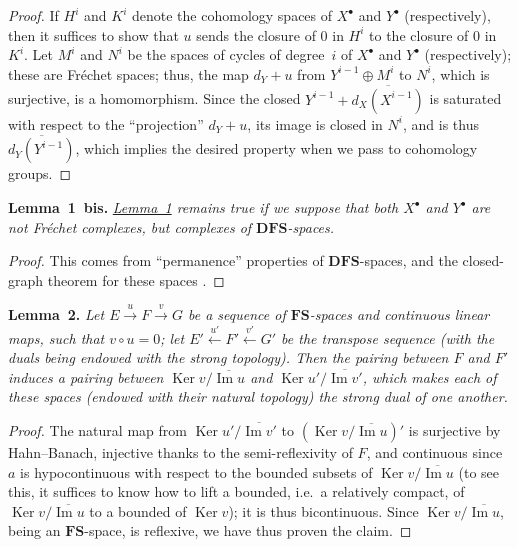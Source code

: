\documentclass[british]{article}
\newenvironment{itenv}[1]
  {\phantomsection\par\smallskip\noindent\textbf{#1.}\itshape}
  {\par\smallskip}
\newcommand{\oldpage}[1]{\marginpar{\footnotesize$\Big\vert$ \textit{p.~#1}}}
\begin{document}
\begin{proof}
If \(H^i\) and \(K^i\) denote the cohomology spaces of \(X^\bullet\) and
\(Y^\bullet\) (respectively), then it suffices to show that \(u\) sends
the closure of \(0\) in \(H^i\) to the closure of \(0\) in \(K^i\). Let
\(M^i\) and \(N^i\) be the spaces of cycles of degree~\(i\) of
\(X^\bullet\) and \(Y^\bullet\) (respectively); these are Fréchet
spaces; thus, the map \(d_Y+u\) from \(Y^{i-1}\oplus M^i\) to \(N^i\),
which is surjective, is a homomorphism. Since the closed
\(Y^{i-1}+\overline{d_X(X^{i-1})}\) is saturated with respect to the
``projection'' \(d_Y+u\), its image is closed in \(N^i\), and is thus
\(\overline{d_Y(Y^{i-1})}\), which implies the desired property when we
pass to cohomology groups.
\end{proof}

\protect{}\label{lemma-1-bis}
\begin{itenv}{Lemma 1 bis}
\hyperref[lemma-1]{Lemma~1} remains true if we suppose that both
\(X^\bullet\) and \(Y^\bullet\) are not Fréchet complexes, but complexes
of \(\mathbf{DFS}\)-spaces.

\end{itenv}

\begin{proof}
This comes from ``permanence'' properties of \(\mathbf{DFS}\)-spaces,
and the closed-graph theorem for these spaces \autocite{15}.
\end{proof}

\protect{}\label{lemma-2}
\begin{itenv}{Lemma 2}
Let \(E\xrightarrow{u}F\xrightarrow{v}G\) be a sequence of
\(\mathbf{FS}\)-spaces and continuous linear maps, such that
\(v\circ u=0\); let \(E'\xleftarrow{u'}F'\xleftarrow{v'}G'\) be the
transpose sequence (with the duals being endowed with the strong
topology). Then the pairing between \(F\) and \(F'\) induces a pairing
between \(\operatorname{Ker}{v}/\overline{\operatorname{Im}{u}}\) and
\(\operatorname{Ker}{u'}/\overline{\operatorname{Im}{v'}}\), which makes
each of these spaces (endowed with their natural topology) the strong
dual of one another.

\end{itenv}

\begin{proof}
The natural map from
\(\operatorname{Ker}{u'}/\overline{\operatorname{Im}{v'}}\) to
\((\operatorname{Ker}{v}/\overline{\operatorname{Im}u})'\) is surjective
by Hahn--Banach, injective thanks to the semi-reflexivity of \(F\), and
continuous since \(a\) is hypocontinuous with respect to the bounded
subsets of \(\operatorname{Ker}{v}/\overline{\operatorname{Im}{u}}\) (to
see this, it suffices to know how to lift a bounded, i.e.~a relatively
compact, of \(\operatorname{Ker}{v}/\overline{\operatorname{Im}{u}}\) to
a bounded of \(\operatorname{Ker}{v}\)); it is thus bicontinuous.
\oldpage{79} Since
\(\operatorname{Ker}{v}/\overline{\operatorname{Im}{u}}\), being an
\(\mathbf{FS}\)-space, is reflexive, we have thus proven the claim.
\end{proof}
\end{document}
